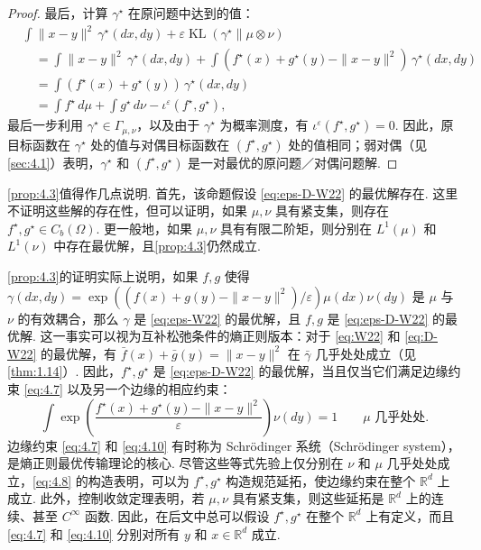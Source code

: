 \begin{proof}
最后，计算 $\gamma^\star$ 在原问题中达到的值：
$$\begin{aligned}
&\int\|x-y\|^2\,\gamma^\star(dx,dy)+\varepsilon\operatorname{KL}(\gamma^\star\|\mu\otimes\nu)\\
&\quad=\int\|x-y\|^2\,\gamma^\star(dx,dy)
+\int(f^\star(x)+g^\star(y)-\|x-y\|^2)\,\gamma^\star(dx,dy)\\
&\quad=\int(f^\star(x)+g^\star(y))\,\gamma^\star(dx,dy)\\
&\quad=\int f^\star\,d\mu+\int g^\star\,d\nu-\iota^\varepsilon(f^\star,g^\star),
\end{aligned}$$
最后一步利用 $\gamma^\star\in\Gamma_{\mu,\nu}$，以及由于 $\gamma^\star$ 为概率测度，有 $\iota^\varepsilon(f^\star,g^\star)=0$. 因此，原目标函数在 $\gamma^\star$ 处的值与对偶目标函数在 $(f^\star,g^\star)$ 处的值相同；弱对偶（见\autoref{sec:4.1}）表明，$\gamma^\star$ 和 $(f^\star,g^\star)$ 是一对最优的原问题／对偶问题解.
\end{proof}

\autoref{prop:4.3}值得作几点说明. 首先，该命题假设 \eqref{eq:eps-D-W22} 的最优解存在. 这里不证明这些解的存在性，但可以证明，如果 $\mu,\nu$ 具有紧支集，则存在 $f^\star,g^\star\in C_b(\Omega)$. 更一般地，如果 $\mu,\nu$ 具有有限二阶矩，则分别在 $L^1(\mu)$ 和 $L^1(\nu)$ 中存在最优解，且\autoref{prop:4.3}仍然成立.

\autoref{prop:4.3}的证明实际上说明，如果 $f,g$ 使得 $\gamma(dx,dy)=\exp((f(x)+g(y)-\|x-y\|^2)/\varepsilon)\mu(dx)\nu(dy)$ 是 $\mu$ 与 $\nu$ 的有效耦合，那么 $\gamma$ 是 \eqref{eq:eps-W22} 的最优解，且 $f,g$ 是 \eqref{eq:eps-D-W22} 的最优解. 这一事实可以视为互补松弛条件的熵正则版本：对于 \eqref{eq:W22} 和 \eqref{eq:D-W22} 的最优解，有 $\bar f(x)+\bar g(y)=\|x-y\|^2$ 在 $\bar\gamma$ 几乎处处成立（见\autoref{thm:1.14}）. 因此，$f^\star,g^\star$ 是 \eqref{eq:eps-D-W22} 的最优解，当且仅当它们满足边缘约束 \eqref{eq:4.7} 以及另一个边缘的相应约束：
\begin{equation}\label{eq:4.10}
\int\exp\left(\frac{f^\star(x)+g^\star(y)-\|x-y\|^2}{\varepsilon}\right)\nu(dy)=1
\qquad\mu\text{ 几乎处处}.
\end{equation}
边缘约束 \eqref{eq:4.7} 和 \eqref{eq:4.10} 有时称为 Schr\"odinger 系统（Schr\"odinger system），是熵正则最优传输理论的核心. 尽管这些等式先验上仅分别在 $\nu$ 和 $\mu$ 几乎处处成立，\eqref{eq:4.8} 的构造表明，可以为 $f^\star,g^\star$ 构造规范延拓，使边缘约束在整个 $\mathbb R^d$ 上成立. 此外，控制收敛定理表明，若 $\mu,\nu$ 具有紧支集，则这些延拓是 $\mathbb R^d$ 上的连续、甚至 $C^\infty$ 函数. 因此，在后文中总可以假设 $f^\star,g^\star$ 在整个 $\mathbb R^d$ 上有定义，而且 \eqref{eq:4.7} 和 \eqref{eq:4.10} 分别对所有 $y$ 和 $x\in\mathbb R^d$ 成立.

